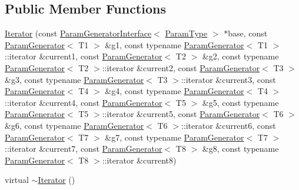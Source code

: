 \subsection*{\-Public \-Member \-Functions}
\begin{DoxyCompactItemize}
\item 
\hyperlink{classtesting_1_1internal_1_1CartesianProductGenerator8_1_1Iterator_ab9ec04d7e23de34d28db54a3494e1cee}{\-Iterator} (const \hyperlink{classtesting_1_1internal_1_1ParamGeneratorInterface}{\-Param\-Generator\-Interface}$<$ \hyperlink{classtesting_1_1internal_1_1CartesianProductGenerator8_a1323810362151af79d39617fabdcade1}{\-Param\-Type} $>$ $\ast$base, const \hyperlink{classtesting_1_1internal_1_1ParamGenerator}{\-Param\-Generator}$<$ \-T1 $>$ \&g1, const typename \hyperlink{classtesting_1_1internal_1_1ParamGenerator}{\-Param\-Generator}$<$ \-T1 $>$\-::iterator \&current1, const \hyperlink{classtesting_1_1internal_1_1ParamGenerator}{\-Param\-Generator}$<$ \-T2 $>$ \&g2, const typename \hyperlink{classtesting_1_1internal_1_1ParamGenerator}{\-Param\-Generator}$<$ \-T2 $>$\-::iterator \&current2, const \hyperlink{classtesting_1_1internal_1_1ParamGenerator}{\-Param\-Generator}$<$ \-T3 $>$ \&g3, const typename \hyperlink{classtesting_1_1internal_1_1ParamGenerator}{\-Param\-Generator}$<$ \-T3 $>$\-::iterator \&current3, const \hyperlink{classtesting_1_1internal_1_1ParamGenerator}{\-Param\-Generator}$<$ \-T4 $>$ \&g4, const typename \hyperlink{classtesting_1_1internal_1_1ParamGenerator}{\-Param\-Generator}$<$ \-T4 $>$\-::iterator \&current4, const \hyperlink{classtesting_1_1internal_1_1ParamGenerator}{\-Param\-Generator}$<$ \-T5 $>$ \&g5, const typename \hyperlink{classtesting_1_1internal_1_1ParamGenerator}{\-Param\-Generator}$<$ \-T5 $>$\-::iterator \&current5, const \hyperlink{classtesting_1_1internal_1_1ParamGenerator}{\-Param\-Generator}$<$ \-T6 $>$ \&g6, const typename \hyperlink{classtesting_1_1internal_1_1ParamGenerator}{\-Param\-Generator}$<$ \-T6 $>$\-::iterator \&current6, const \hyperlink{classtesting_1_1internal_1_1ParamGenerator}{\-Param\-Generator}$<$ \-T7 $>$ \&g7, const typename \hyperlink{classtesting_1_1internal_1_1ParamGenerator}{\-Param\-Generator}$<$ \-T7 $>$\-::iterator \&current7, const \hyperlink{classtesting_1_1internal_1_1ParamGenerator}{\-Param\-Generator}$<$ \-T8 $>$ \&g8, const typename \hyperlink{classtesting_1_1internal_1_1ParamGenerator}{\-Param\-Generator}$<$ \-T8 $>$\-::iterator \&current8)
\item 
virtual \hyperlink{classtesting_1_1internal_1_1CartesianProductGenerator8_1_1Iterator_a47b331bac1d130f2bab2c40e76ccb54a}{$\sim$\-Iterator} ()

\end{DoxyCompactItemize}
